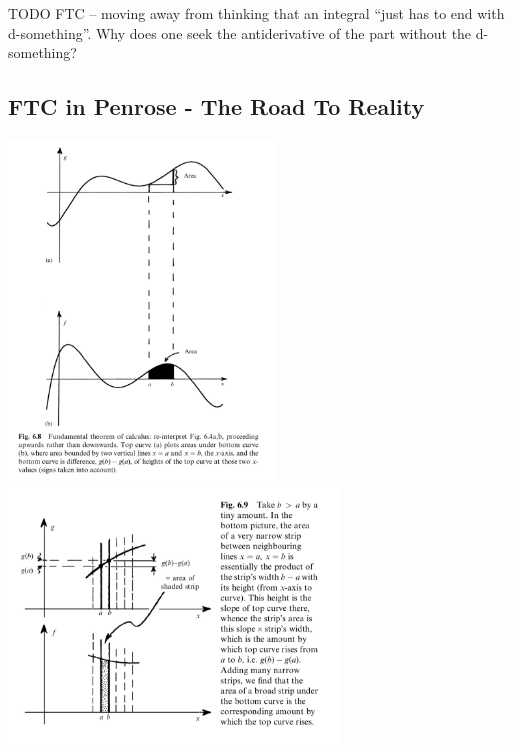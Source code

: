 TODO FTC -- moving away from thinking that an integral ``just has to end with
d-something''. Why does one seek the antiderivative of the part without the
d-something?



\subsection*{FTC in Penrose - The Road To Reality}

\begin{mdframed}
  \includegraphics[width=200pt]{img/calculus-ftc-penrose-1.png}
  \includegraphics[width=250pt]{img/calculus-ftc-penrose-2.png}
\end{mdframed}

